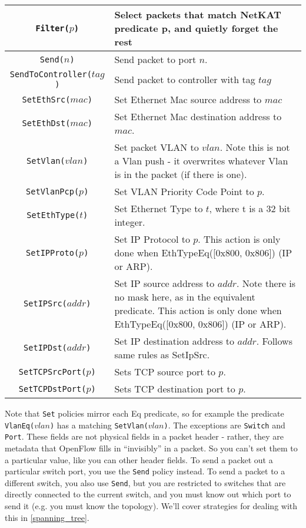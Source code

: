 \bigskip
\begin{tabularx}{6in}{|c|X|}
\hline\hline
\texttt{Filter($p$)} & Select packets that match NetKAT predicate p, and quietly forget the rest  
\\ \hline
\texttt{Send($n$)} & Send packet to port $n$.    
\\ \hline
\texttt{SendToController($tag$)} & Send packet to controller with tag $tag$    
\\ \hline
\texttt{SetEthSrc($mac$)} & Set Ethernet Mac source address to $mac$
\\ \hline
\texttt{SetEthDst($mac$)} & Set Ethernet Mac destination address to $mac$.
\\ \hline
\texttt{SetVlan($vlan$)} & Set packet VLAN to $vlan$.  Note this is not a Vlan push - it overwrites whatever 
Vlan is in the packet (if there is one).  
\\ \hline
\texttt{SetVlanPcp($p$)} & Set VLAN Priority Code Point to $p$.
\\ \hline
\texttt{SetEthType($t$)} & Set Ethernet Type to $t$, where t is a 32 bit integer.
\\ \hline
\texttt{SetIPProto($p$)} & Set IP Protocol to $p$.    
This action is only done when EthTypeEq([0x800, 0x806]) (IP or ARP). 
\\ \hline
\texttt{SetIPSrc($addr$)} & Set IP source address to $addr$.  Note there is no mask here, as in the equivalent predicate.  
This action is only done when EthTypeEq([0x800, 0x806]) (IP or ARP). 
\\ \hline
\texttt{SetIPDst($addr$)} & Set IP destination address to $addr$.  
Follows same rules as SetIpSrc.
\\ \hline
\texttt{SetTCPSrcPort($p$)} & Sets TCP source port to $p$.
\\ \hline
\texttt{SetTCPDstPort($p$)} & Sets TCP destination port to $p$.  
\\ \hline\hline
\end{tabularx}
\bigskip

Note that \texttt{Set} policies mirror each Eq predicate, so for example the predicate \texttt{VlanEq($vlan$)} has a matching
\texttt{SetVlan($vlan$)}.
The exceptions are \texttt{Switch} and \texttt{Port}.  
These fields are not physical fields in a packet header - rather, they are metadata that OpenFlow fills in ``invisibly''
in a packet.
So you can't set them to a particular value, like you can other header fields.
To send a packet out a particular switch port, you use the \texttt{Send} policy instead.  
To send a packet to a different switch, you also use \texttt{Send}, but you are restricted to switches that are directly
connected to the current switch, and you must know out which port to send it (e.g. you must know the topology).
We'll cover strategies for dealing with this in \ref{spanning_tree}.
 
